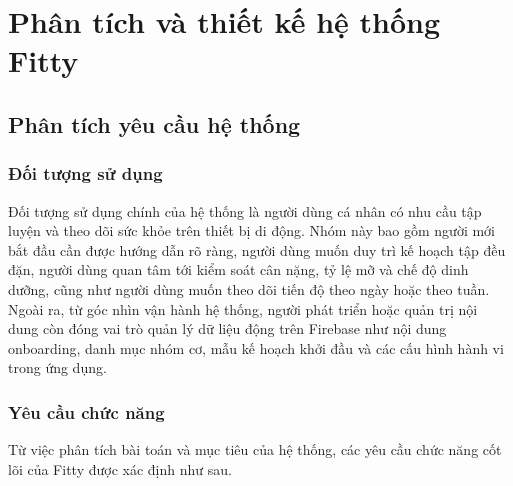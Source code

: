 ﻿\chapter{Phân tích và thiết kế hệ thống Fitty}

\section{Phân tích yêu cầu hệ thống}

\subsection{Đối tượng sử dụng}

Đối tượng sử dụng chính của hệ thống là người dùng cá nhân có nhu cầu tập luyện và theo dõi sức khỏe trên thiết bị di động. Nhóm này bao gồm người mới bắt đầu cần được hướng dẫn rõ ràng, người dùng muốn duy trì kế hoạch tập đều đặn, người dùng quan tâm tới kiểm soát cân nặng, tỷ lệ mỡ và chế độ dinh dưỡng, cũng như người dùng muốn theo dõi tiến độ theo ngày hoặc theo tuần. Ngoài ra, từ góc nhìn vận hành hệ thống, người phát triển hoặc quản trị nội dung còn đóng vai trò quản lý dữ liệu động trên Firebase như nội dung onboarding, danh mục nhóm cơ, mẫu kế hoạch khởi đầu và các cấu hình hành vi trong ứng dụng.

\subsection{Yêu cầu chức năng}

Từ việc phân tích bài toán và mục tiêu của hệ thống, các yêu cầu chức năng cốt lõi của Fitty được xác định như sau.

